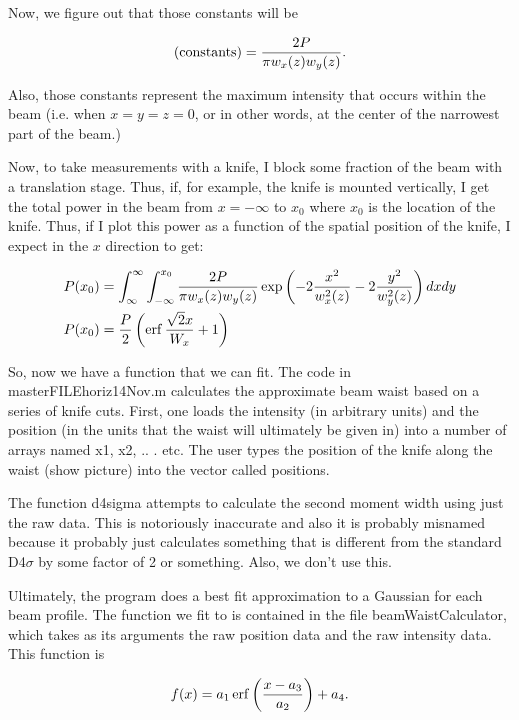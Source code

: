 Now, we figure out that those constants will be

\begin{equation}
({\rm constants})=\frac{2 P}{\pi w_x(z) w_y(z)}.
\end{equation}

Also, those constants represent the maximum intensity that occurs within the beam (i.e. when $x=y=z=0$, or in other words, at the center of the narrowest part of the beam.)

Now, to take measurements with a knife, I block some fraction of the beam with a translation stage. Thus, if, for example, the knife is mounted vertically, I get the total power in the beam from $x=-\infty$ to $x_0$ where $x_0$ is the location of the knife. Thus, if I plot this power as a function of the spatial position of the knife, I expect in the $x$ direction to get: 

\begin{align}
P(x_0)&=\int_{\infty}^{\infty}\int_{-\infty}^{x_0} \frac{2 P}{\pi w_x(z) w_y(z)}\exp \left(-2\frac{x^2}{w_x^2(z)}-2\frac{y^2}{w_y^2(z)}\right) dx dy\\
P(x_0)&=\frac{P}{2} \left(\operatorname{erf} \frac{\sqrt{2} x}{W_x}+1 \right)
\end{align}

So, now we have a function that we can fit. The code in masterFILEhoriz14Nov.m calculates the approximate beam waist based on a series of knife cuts. First, one loads the intensity (in arbitrary units) and the position (in the units that the waist will ultimately be given in) into a number of arrays named x1, x2, .. . etc. The user types the position of the knife along the waist (show picture) into the vector called positions. 

The function d4sigma attempts to calculate the second moment width using just the raw data. This is notoriously inaccurate and also it is probably misnamed because it probably just calculates something that is different from the standard D4$\sigma$ by some factor of 2 or something. Also, we don't use this. 

Ultimately, the program does a best fit approximation to a Gaussian for each beam profile. The function we fit to is contained in the file beamWaistCalculator, which takes as its arguments the raw position data and the raw intensity data. This function is 

\begin{equation}
f(x)=a_1 \operatorname{erf} \left(\frac{x-a_3}{a_2}\right)+a_4.
\end{equation}

